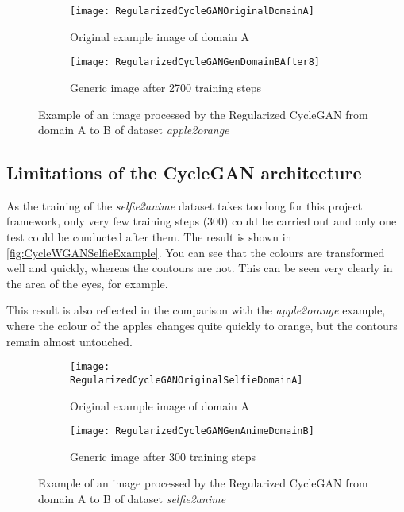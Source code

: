 \documentclass[fleqn,10pt]{SelfArx} %
\begin{document}
\begin{figure}[htb] 
	\centering 
\begin{subfigure}[b]{0.45\linewidth}
	\texttt{[image: RegularizedCycleGANOriginalDomainA]}
	\caption{Original example image of domain A}
\end{subfigure}
\hfill
\begin{subfigure}[b]{0.45\linewidth}
	\texttt{[image: RegularizedCycleGANGenDomainBAfter8]}
	\caption{Generic image after 2700 training steps}
	\end{subfigure}
\caption{Example of an image processed by the Regularized Cycle\ac{GAN} from domain A to B of dataset \textit{apple2orange}}
\label{fig:RegularizedCycleGANExample}
\end{figure}

\subsection{Limitations of the Cycle\ac{GAN} architecture}
As the training of the \textit{selfie2anime} dataset takes too long for this project framework, only very few training steps (300) could be carried out and only one test could be conducted after them. The result is shown in \autoref{fig:CycleWGANSelfieExample}. You can see that the colours are transformed well and quickly, whereas the contours are not. This can be seen very clearly in the area of the eyes, for example.

This result is also reflected in the comparison with the \textit{apple2orange} example, where the colour of the apples changes quite quickly to orange, but the contours remain almost untouched.

\begin{figure}[htb] 
	\centering 
\begin{subfigure}[b]{0.45\linewidth}
	\texttt{[image: RegularizedCycleGANOriginalSelfieDomainA]}
	\caption{Original example image of domain A}
\end{subfigure}
\hfill
\begin{subfigure}[b]{0.45\linewidth}
	\texttt{[image: RegularizedCycleGANGenAnimeDomainB]}
	\caption{Generic image after 300 training steps}
	\end{subfigure}
\caption{Example of an image processed by the Regularized Cycle\ac{GAN} from domain A to B of dataset \textit{selfie2anime}}
\label{fig:CycleWGANSelfieExample}
\end{figure}
\end{document}
